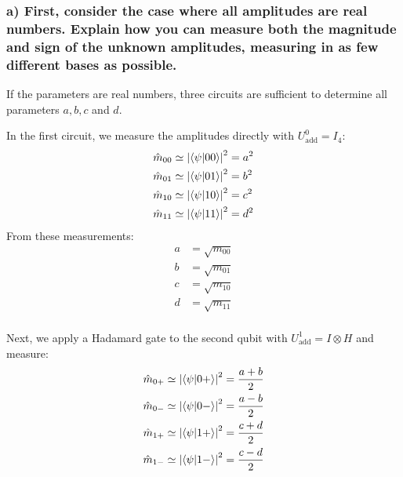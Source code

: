 \documentclass[a4paper, 11pt]{article}
\begin{document}
\subsubsection*{a) First, consider the case where all amplitudes are real numbers. Explain how you can measure both the magnitude and sign of the unknown amplitudes, measuring in as few different bases as possible.}

If the parameters are real numbers, three circuits are sufficient to determine all parameters $a, b, c$ and $d$.

In the first circuit, we measure the amplitudes directly with $U_{\text{add}}^{0} = I_4$:
\begin{align}
  \hat{m}_{00} &\simeq \left| \bra{\psi}\ket{00} \right|^2 = a^2 \\ 
  \hat{m}_{01} &\simeq \left| \bra{\psi}\ket{01} \right|^2 = b^2 \\ 
  \hat{m}_{10} &\simeq \left| \bra{\psi}\ket{10} \right|^2 = c^2 \\ 
  \hat{m}_{11} &\simeq \left| \bra{\psi}\ket{11} \right|^2 = d^2  
\end{align}
From these measurements:
\begin{align}
  a &= \sqrt{m_{00}} \\
  b &= \sqrt{m_{01}} \\
  c &= \sqrt{m_{10}} \\
  d &= \sqrt{m_{11}} \\
\end{align}

Next, we apply a Hadamard gate to the second qubit with $U_{\text{add}}^{1} = I \otimes H$ and measure:
\begin{align}
  \hat{m}_{0+} &\simeq \left| \bra{\psi}\ket{0+} \right|^2 = \frac{a+b}{2} \\ 
  \hat{m}_{0-} &\simeq \left| \bra{\psi}\ket{0-} \right|^2 = \frac{a-b}{2} \\ 
  \hat{m}_{1+} &\simeq \left| \bra{\psi}\ket{1+} \right|^2 = \frac{c+d}{2} \\ 
  \hat{m}_{1-} &\simeq \left| \bra{\psi}\ket{1-} \right|^2 = \frac{c-d}{2}  
\end{align}
\end{document}
